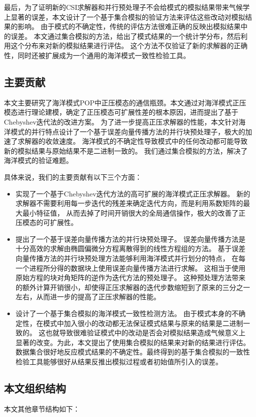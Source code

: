 最后，为了证明新的CSI求解器和并行预处理子不会给模式的模拟结果带来气候学上显著的误差，本文设计了一个基于集合模拟的验证方法来评估这些改动对模拟结果的影响。 
由于模式的不确定性，传统的评估方法很难正确的反映出模拟结果中的误差。
本文通过集合模拟的方法，给出了模式结果的一个统计学分布，然后利用这个分布来对新的模拟结果进行评估。
这个方法不仅验证了新的求解器的正确性，同时还被扩展成为一个通用的海洋模式一致性检验工具。 

\subsection{主要贡献}
本文主要研究了海洋模式POP中正压模态的通信瓶颈。本文通过对海洋模式正压模态进行理论建模，确定了正压模态可扩展性差的根本原因，进而提出了基于Chebyshev迭代法的改进方案。
为了进一步提高正压求解器的性能，本文针对海洋模式的并行特点设计了一个基于误差向量传播方法的并行块预处理子，极大的加速了求解器的收敛速度。
海洋模式的不确定性导致模式中的任何改动都可能导致新的模拟结果与原始结果不是二进制一致的。
我们通过集合模拟的方法，解决了海洋模式的验证难题。

具体来说，我们的主要贡献有以下三个方面：
\begin{itemize}
 	\item {\kaishu 实现了一个基于Chebyshev迭代方法的高可扩展的海洋模式正压求解器。} 
 	新的求解器不需要利用每一步迭代的残差来确定迭代方向，而是利用系数矩阵的最大最小特征值，
 	从而去掉了时间开销很大的全局通信操作，极大的改善了正压模态的可扩展性。
    \item {\kaishu 提出了一个基于误差向量传播方法的并行块预处理子。}
    误差向量传播方法是十分高效的求解由椭圆偏微分方程离散得到的线性方程组的方法。
    基于误差向量传播方法的并行块预处理方法能够利用海洋模式并行划分的特点，
    在每一个进程所分得的数据块上使用误差向量传播方法进行求解。
    这相当于使用原始方程的块对角矩阵的逆作为迭代方法的预处理子。
    这种预处理方法带来的额外计算开销很小，却使得正压求解器的迭代步数缩短到了原来的三分之一左右，从而进一步的提高了正压求解器的性能。
    \item {\kaishu 设计了一个基于集合模拟的海洋模式一致性检测方法。}
    由于模式本身的不确定性，在模式中加入很小的改动都无法保证模式结果与原来的结果是二进制一致的。
    这也就导致很难验证模式中的改动是否会对模拟结果造成气候意义上显著的改变。为此，本文提出了使用集合模拟的结果来对新的结果进行评估。数据集合很好地反应模式结果的不确定性。最终得到的基于集合模拟的一致性检验工具能够很好从结果反推出模拟过程或者初始值所引入的误差。  
\end{itemize}
\subsection{本文组织结构}
本文其他章节结构如下：

